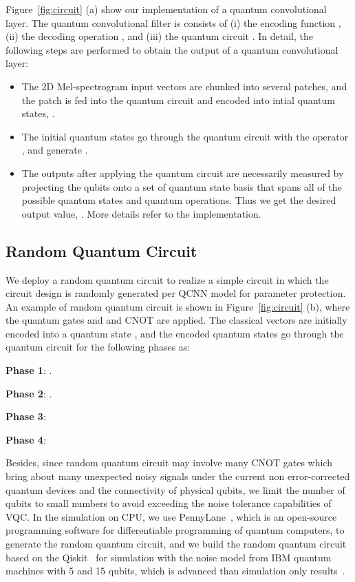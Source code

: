 \documentclass{article}
\begin{document}
Figure~\ref{fig:circuit} (a) show our implementation of a quantum convolutional layer. The quantum convolutional filter is consists of (i) the encoding function , (ii) the decoding operation , and (iii) the quantum circuit . In detail, the following steps are performed to obtain the output of a quantum convolutional layer:
\begin{itemize}
\item The 2D Mel-spectrogram input vectors are chunked into several  patches, and the  patch is fed into the quantum circuit and encoded into intial quantum states, . 
\item The initial quantum states go through the quantum circuit with the operator , and generate . 

\item The outputs after applying the quantum circuit are necessarily measured by projecting the qubits onto a set of quantum state basis that spans all of the possible quantum states and quantum operations. Thus we get the desired output value,  . More details refer to the implementation.
\end{itemize}






\vspace{-3mm}
\subsection{Random Quantum Circuit}
We deploy a random quantum circuit to realize a simple circuit  in which the circuit design is randomly generated per QCNN model for parameter protection. An example of random quantum circuit is shown in Figure~\ref{fig:circuit} (b), where the quantum gates  and  and CNOT are applied. The classical vectors are initially encoded into a quantum state , and the encoded quantum states go through the quantum circuit  for the following phases as:

\noindent \textbf{Phase 1}: . 

\noindent \textbf{Phase 2}: .

\noindent \textbf{Phase 3}: 


\noindent \textbf{Phase 4}:


Besides, since random quantum circuit may involve many CNOT gates which bring about many unexpected noisy signals under the current non error-corrected quantum devices and the connectivity of physical qubits, we limit the number of qubits to small numbers to avoid exceeding the noise tolerance capabilities of VQC. In the simulation on CPU, we use PennyLane~\cite{bergholm2018pennylane}, which is an open-source programming software for differentiable programming of quantum computers, to generate the random quantum circuit, and we build the random quantum circuit based on the Qiskit~\cite{aleksandrowicz2019qiskit} for simulation with the noise model from IBM  quantum machines with 5 and 15 qubits, which is advanced than simulation only results~\cite{henderson2020quanvolutional}.
\end{document}
